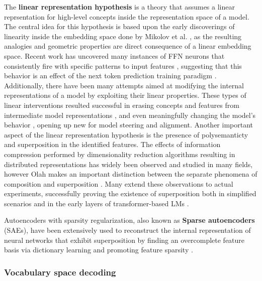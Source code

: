 The \textbf{linear representation hypothesis} \cite{park2023} is a theory that assumes a linear reprsentation for high-level concepts inside the representation space of a model.
The central idea for this hypothesis is based upon the early discoverings of linearity inside the embedding space done by Mikolov et al. \cite{mikolov2013}, as the resulting analogies and geometric properties are direct consequence of a linear embedding space.
Recent work has uncovered many instances of FFN neurons that consistently fire with specific patterns  to input features \cite{voita2023}, suggesting that this behavior is an effect of the next token prediction training paradigm \cite{jiang2024}.
Additionally, there have been many attempts aimed at modifying the internal representations of a model by exploiting their linear properties.
These types of linear interventions resulted successful in erasing concepts and features from intermediate model representations \cite{ravfogel2020, ravfogel2022, belrose2023b}, and even meaningfully changing the model's behavior \cite{nanda2023, belrose2023b}, opening up new  for model steering and alignment. 
Another important aspect of the linear representation hypothesis is the presence of polysemanticty and superposition in the identified features.
The effects of information compression performed by dimensionality reduction algorithms resulting in distributed representations has widely been observed and studied in many fields, however Olah makes an important distinction between the separate phenomena of composition and superposition \cite{olah2023}.
Many extend these observations to actual experiments, successfully proving the existence of superposition both in simplified scenarios \cite{elhage2022, arora2018} and in the early layers of transformer-based LMs \cite{gurnee2023}.


Autoencoders with sparsity regularization, also known as \textbf{Sparse autoencoders} (SAEs), have been extensively used to reconstruct the internal representation of neural networks that exhibit superposition by finding an overcomplete feature basis via dictionary learning and promoting feature sparsity \cite{bricken2023, cunningham2023}.

\subsubsection{Vocabulary space decoding}

